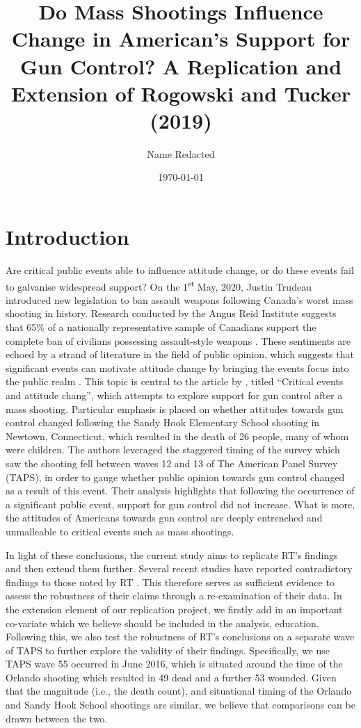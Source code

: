 \documentclass[11pt]{article}
\title{Do Mass Shootings Influence Change in American's Support for Gun Control? A Replication and Extension of Rogowski and Tucker (2019)}
\author{Name Redacted}
\date{\today}
\begin{document}
\maketitle

\section*{Introduction}
Are critical public events able to influence attitude change, or do these events fail to galvanise widespread support? On the 1\textsuperscript{st} May, 2020, Justin Trudeau introduced new legislation to ban assault weapons following Canada’s worst mass shooting in history. Research conducted by the Angus Reid Institute suggests that 65\% of a nationally representative sample of Canadians support the complete ban of civilians possessing assault-style weapons \autocite{angus-reid-institute2020four-in-five-ca}. These sentiments are echoed by a strand of literature in the field of public opinion, which suggests that significant events can motivate attitude change by bringing the events focus into the public realm \autocites{carmines1989issue-evolution}{zaller1992the-nature-and-}. This topic is central to the article by \textcite[][the two authors are hereafter abbreviated as RT]{rogowski2019critical-events}, titled ``Critical events and attitude chang'', which attempts to explore support for gun control after a mass shooting. Particular emphasis is placed on whether attitudes towards gun control changed following the Sandy Hook Elementary School shooting in Newtown, Connecticut, which resulted in the death of 26 people, many of whom were children. The authors leveraged the staggered timing of the survey which saw the shooting fell between waves 12 and 13 of The American Panel Survey (TAPS), in order to gauge whether public opinion towards gun control changed as a result of this event. Their analysis highlights that following the occurrence of a significant public event, support for gun control did not increase. What is more, the attitudes of Americans towards gun control are deeply entrenched and unmalleable to critical events such as mass shootings.

In light of these conclusions, the current study aims to replicate RT’s findings and then extend them further. Several recent studies have reported contradictory findings to those noted by RT \autocites{wozniak2015american-public}{newman2019mass-shootings-}{barney2019reexamining-the}. This therefore serves as sufficient evidence to assess the robustness of their claims through a re-examination of their data. In the extension element of our replication project, we firstly add in an important co-variate which we believe should be included in the analysis, education. Following this, we also test the robustness of RT's conclusions on a separate wave of TAPS to further explore the validity of their findings. Specifically, we use TAPS wave 55 occurred in June 2016, which is situated around the time of the Orlando shooting which resulted in 49 dead and a further 53 wounded. Given that the magnitude (i.e., the death count), and situational timing of the Orlando and Sandy Hook School shootings are similar, we believe that comparisons can be drawn between the two. 
\end{document}
